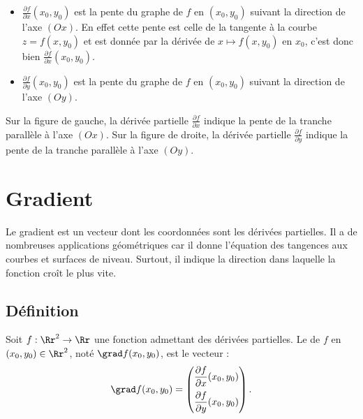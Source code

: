 \documentclass[11pt,class=report,crop=false]{standalone}
\begin{document}
\begin{itemize}
  \item $\frac{\partial f}{\partial x} (x_0,y_0)$ est la pente du graphe de $f$
 en $(x_0,y_0)$ suivant la direction de l'axe $(Ox)$.
 En effet cette pente est celle de la tangente à la courbe $z = f(x,y_0)$ et est donnée par la dérivée de $x \mapsto f(x,y_0)$ en $x_0$, c'est donc bien $\frac{\partial f}{\partial x} (x_0,y_0)$.
 
 \item $\frac{\partial f}{\partial y} (x_0,y_0)$ est la pente du graphe de $f$
 en $(x_0,y_0)$ suivant la direction de l'axe $(Oy)$.
 

\end{itemize}

 
 
\bigskip 
Sur la figure de gauche, la dérivée partielle  $\frac{\partial f}{\partial x}$ indique la pente de la tranche parallèle à l'axe $(Ox)$. Sur la figure de droite, la dérivée partielle  $\frac{\partial f}{\partial y}$ indique la pente de la tranche parallèle à l'axe $(Oy)$.







\section{Gradient}

Le gradient est un vecteur dont les coordonnées sont les dérivées partielles. Il a de nombreuses applications géométriques car il donne l'équation des tangences aux courbes et surfaces de niveau. Surtout, il indique la direction dans laquelle la fonction croît le plus vite.

\subsection{Définition}

\begin{definition}
Soit $f : \Rr^2 \to \Rr$ une fonction admettant des dérivées partielles.
Le  de $f$ en $(x_0,y_0) \in \Rr^2$, noté 
$\grad f (x_0,y_0)$, est le vecteur :
$$\grad f (x_0,y_0) =
\begin{pmatrix} \dfrac{\partial f}{\partial x} (x_0,y_0)\\[2ex] \dfrac{\partial f}{\partial y}(x_0,y_0)\end{pmatrix}.$$
\end{definition}
\end{document}
